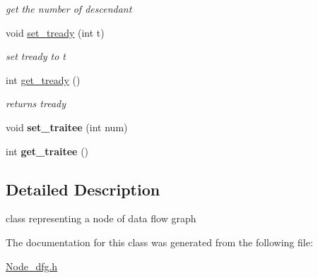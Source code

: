\begin{DoxyCompactItemize}
\begin{DoxyCompactList}\small\item\em get the number of descendant \end{DoxyCompactList}\item 
\hypertarget{classNode__dfg_ad9fe88cf90fa2282806edbc64f51331e}{void \hyperlink{classNode__dfg_ad9fe88cf90fa2282806edbc64f51331e}{set\-\_\-tready} (int t)}\label{classNode__dfg_ad9fe88cf90fa2282806edbc64f51331e}

\begin{DoxyCompactList}\small\item\em set tready to t \end{DoxyCompactList}\item 
\hypertarget{classNode__dfg_a05e8db316dd2db8b0946167763585c7b}{int \hyperlink{classNode__dfg_a05e8db316dd2db8b0946167763585c7b}{get\-\_\-tready} ()}\label{classNode__dfg_a05e8db316dd2db8b0946167763585c7b}

\begin{DoxyCompactList}\small\item\em returns tready \end{DoxyCompactList}\item 
\hypertarget{classNode__dfg_a07364912fb02e421e79597f91cf5140f}{void {\bfseries set\-\_\-traitee} (int num)}\label{classNode__dfg_a07364912fb02e421e79597f91cf5140f}

\item 
\hypertarget{classNode__dfg_a1b0ec3773d7eaaaf44f40b91cc6b4358}{int {\bfseries get\-\_\-traitee} ()}\label{classNode__dfg_a1b0ec3773d7eaaaf44f40b91cc6b4358}

\end{DoxyCompactItemize}


\subsection{\-Detailed \-Description}
class representing a node of data flow graph 

\-The documentation for this class was generated from the following file\-:\begin{DoxyCompactItemize}
\item 
\hyperlink{Node__dfg_8h}{\-Node\-\_\-dfg.\-h}\end{DoxyCompactItemize}
